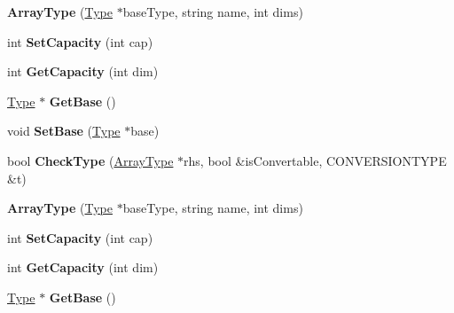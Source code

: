 \begin{DoxyCompactItemize}
\item 
\hypertarget{classArrayType_a90aea374946e0e5cf4b89fc039969f82}{{\bfseries Array\-Type} (\hyperlink{classType}{Type} $\ast$base\-Type, string name, int dims)}\label{classArrayType_a90aea374946e0e5cf4b89fc039969f82}

\item 
\hypertarget{classArrayType_acff47fdbadc911bcb3236dcb9e8dd0a4}{int {\bfseries Set\-Capacity} (int cap)}\label{classArrayType_acff47fdbadc911bcb3236dcb9e8dd0a4}

\item 
\hypertarget{classArrayType_a97ce54630d5df790a8a706cb2f1c5751}{int {\bfseries Get\-Capacity} (int dim)}\label{classArrayType_a97ce54630d5df790a8a706cb2f1c5751}

\item 
\hypertarget{classArrayType_ac874b4e13dba44082d7eec7e057fd74c}{\hyperlink{classType}{Type} $\ast$ {\bfseries Get\-Base} ()}\label{classArrayType_ac874b4e13dba44082d7eec7e057fd74c}

\item 
\hypertarget{classArrayType_ae198281d73c175b70c41856ee9bcfbb9}{void {\bfseries Set\-Base} (\hyperlink{classType}{Type} $\ast$base)}\label{classArrayType_ae198281d73c175b70c41856ee9bcfbb9}

\item 
\hypertarget{classArrayType_ad20dee813ec90843a6333e5823e0128a}{bool {\bfseries Check\-Type} (\hyperlink{classArrayType}{Array\-Type} $\ast$rhs, bool \&is\-Convertable, C\-O\-N\-V\-E\-R\-S\-I\-O\-N\-T\-Y\-P\-E \&t)}\label{classArrayType_ad20dee813ec90843a6333e5823e0128a}

\item 
\hypertarget{classArrayType_a90aea374946e0e5cf4b89fc039969f82}{{\bfseries Array\-Type} (\hyperlink{classType}{Type} $\ast$base\-Type, string name, int dims)}\label{classArrayType_a90aea374946e0e5cf4b89fc039969f82}

\item 
\hypertarget{classArrayType_acff47fdbadc911bcb3236dcb9e8dd0a4}{int {\bfseries Set\-Capacity} (int cap)}\label{classArrayType_acff47fdbadc911bcb3236dcb9e8dd0a4}

\item 
\hypertarget{classArrayType_a97ce54630d5df790a8a706cb2f1c5751}{int {\bfseries Get\-Capacity} (int dim)}\label{classArrayType_a97ce54630d5df790a8a706cb2f1c5751}

\item 
\hypertarget{classArrayType_ac874b4e13dba44082d7eec7e057fd74c}{\hyperlink{classType}{Type} $\ast$ {\bfseries Get\-Base} ()}\label{classArrayType_ac874b4e13dba44082d7eec7e057fd74c}


\end{DoxyCompactItemize}
